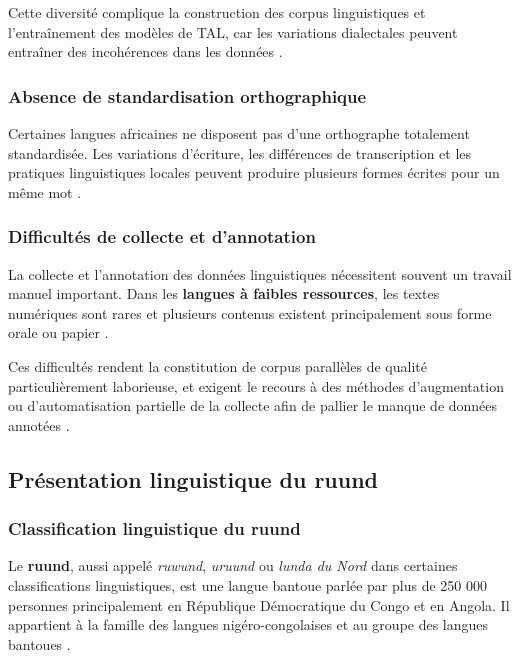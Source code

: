 Cette diversité complique la construction des corpus linguistiques et l'entraînement des modèles de \ac{TAL}, car les variations dialectales peuvent entraîner des incohérences dans les données \cite{haulai2023construction}.

\subsubsection{Absence de standardisation orthographique}

Certaines langues africaines ne disposent pas d'une orthographe totalement standardisée. Les variations d'écriture, les différences de transcription et les pratiques linguistiques locales peuvent produire plusieurs formes écrites pour un même mot \cite{haulai2023construction, jindal2017building}.

\subsubsection{Difficultés de collecte et d'annotation}

La collecte et l'annotation des données linguistiques nécessitent souvent un travail manuel important. Dans les \textbf{langues à faibles ressources}, les textes numériques sont rares et plusieurs contenus existent principalement sous forme orale ou papier \cite{agyei2024low, mandiya2026lingala}.

Ces difficultés rendent la constitution de corpus parallèles de qualité particulièrement laborieuse, et exigent le recours à des méthodes d'augmentation ou d'automatisation partielle de la collecte afin de pallier le manque de données annotées \cite{ranathunga2023neural, sharma2023fully}.

\subsection{Présentation linguistique du ruund}

\subsubsection{Classification linguistique du ruund}

Le \textbf{ruund}, aussi appelé \textit{ruwund}, \textit{uruund} ou \textit{lunda du Nord} dans certaines classifications linguistiques, est une langue bantoue parlée par plus de 250 000 personnes principalement en République Démocratique du Congo et en Angola. Il appartient à la famille des langues nigéro-congolaises et au groupe des langues bantoues \cite{frwiki:199251041}.

